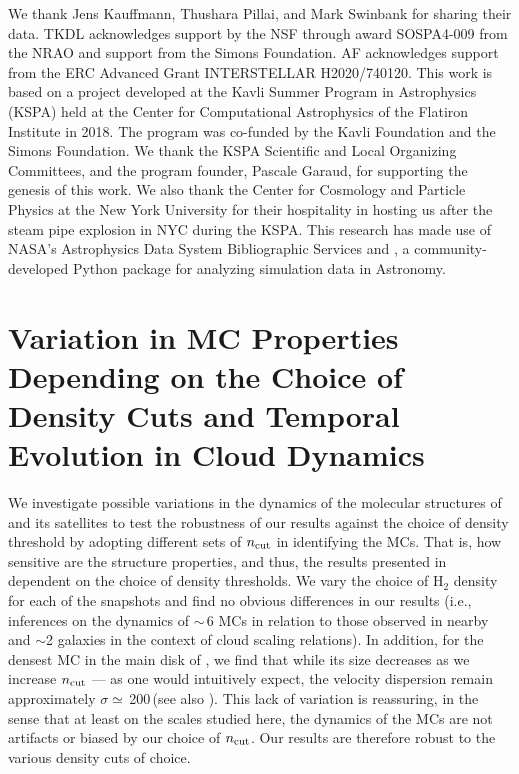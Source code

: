 \IfFileExists{emulateapjlegacy.cls}{\documentclass[iop]{emulateapjlegacy}}{\documentclass[iop]{emulateapj}}
\begin{document}
\acknowledgements

We thank Jens Kauffmann, Thushara Pillai, and Mark Swinbank for sharing their data.
TKDL acknowledges support by the NSF through award SOSPA4-009
from the NRAO and support from the Simons Foundation.
AF acknowledges support from the ERC Advanced Grant INTERSTELLAR H2020/740120.
This work is based on a project developed at the Kavli Summer Program in Astrophysics (KSPA)
held at the Center for
Computational Astrophysics of the Flatiron Institute in 2018. The program was co-funded by the Kavli
Foundation and the Simons Foundation.
We thank the KSPA Scientific and Local Organizing Committees, and the program founder,
Pascale Garaud, for supporting the genesis of this work.
We also thank the Center for Cosmology and Particle Physics
at the New York University
for their hospitality in hosting us after the steam pipe explosion in NYC during the KSPA.
This research has made use of NASA's Astrophysics Data System Bibliographic Services
and , a community-developed Python package for analyzing simulation data in Astronomy.





\appendix
\section{Variation in MC Properties Depending on the Choice of Density Cuts and
Temporal Evolution in Cloud Dynamics}    \label{sec:ncut}
We investigate possible variations in the dynamics of the molecular structures of \flower and its satellites
to test
the robustness of our results against the choice of density threshold by adopting
different sets of $n_{\rm cut}$ in identifying the MCs.
That is, how sensitive are the structure properties, and thus, the results presented in 
dependent on the choice of density thresholds.
We vary the choice of H$_2$ density for each of the snapshots and
find no obvious differences in our results (i.e., inferences on the dynamics of \z$\sim$\,6
MCs in relation to those observed in nearby and \z$\sim$2 galaxies in the context of
cloud scaling relations).
In addition, for the densest MC in the main disk of \flower, we find that while
its size decreases as we increase $n_{\rm cut}$ --- as one would intuitively expect,
the velocity dispersion remain approximately $\sigma\simeq$\,200\,\kms (see also ).
This lack of variation is reassuring, in the sense that at least on the scales studied here,
the dynamics of the MCs are not artifacts or biased by our choice of $n_{\rm cut}$.
Our results are therefore robust to the various density cuts of choice.
\end{document}
